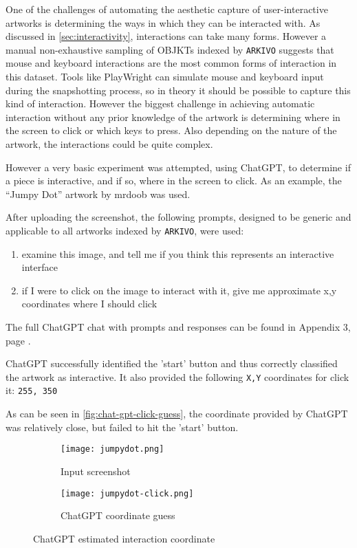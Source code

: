 One of the challenges of automating the aesthetic capture of user-interactive artworks is determining the ways in which they can be interacted with. As discussed in \autoref{sec:interactivity}, interactions can take many forms. However a manual non-exhaustive sampling of OBJKTs indexed by \texttt{ARKIVO} suggests that mouse and keyboard interactions are the most common forms of interaction in this dataset. Tools like PlayWright can simulate mouse and keyboard input during the snapshotting process, so in theory it should be possible to capture this kind of interaction. However the biggest challenge in achieving automatic interaction without any prior knowledge of the artwork is determining where in the screen to click or which keys to press. Also depending on the nature of the artwork, the interactions could be quite complex.

However a very basic experiment was attempted, using ChatGPT, to determine if a piece is interactive, and if so, where in the screen to click. As an example, the ``Jumpy Dot'' artwork by mrdoob was used.

After uploading the screenshot, the following prompts, designed to be generic and applicable to all artworks indexed by \texttt{ARKIVO}, were used:

\begin{enumerate}
	\item examine this image, and tell me if you think this represents an interactive interface
	\item if I were to click on the image to interact with it, give me approximate x,y coordinates where I should click
\end{enumerate}


The full ChatGPT chat with prompts and responses can be found in Appendix 3, page \pageref{chap:chatgpt-mouse}.

ChatGPT successfully identified the 'start' button and thus correctly classified the artwork as interactive. It also provided the following \texttt{X,Y} coordinates for click it: \texttt{255, 350}

As can be seen in \autoref{fig:chat-gpt-click-guess}, the coordinate provided by ChatGPT was relatively close, but failed to hit the 'start' button.

\begin{figure}[H]
  \centering
  \begin{subfigure}[b]{0.45\textwidth}
    \centering
    \texttt{[image: jumpydot.png]}
    \caption{Input screenshot}
    \label{fig:image1}
  \end{subfigure}
  \hfill
  \begin{subfigure}[b]{0.45\textwidth}
    \centering
    \texttt{[image: jumpydot-click.png]}
    \caption{ChatGPT coordinate guess}
    \label{fig:image2}
  \end{subfigure}
  \caption{ChatGPT estimated interaction coordinate}
  \label{fig:chat-gpt-click-guess}
\end{figure}

